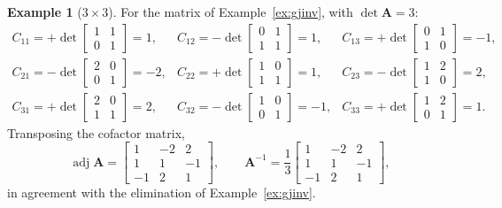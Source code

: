 \documentclass[11pt]{article}
\theoremstyle{plain}
\theoremstyle{definition}
\newtheorem{ex}{Example}[section]
\theoremstyle{remark}
\newcommand{\mt}[1]{\mathbf{#1}}
\DeclareMathOperator{\adj}{adj}
\begin{document}
\begin{ex}[$3\times3$]
For the matrix of Example~\ref{ex:gjinv}, with $\det\mt{A}=3$:
\[
  \begin{array}{lll}
  C_{11}=+\det\begin{bmatrix}1&1\\0&1\end{bmatrix}=1, &
  C_{12}=-\det\begin{bmatrix}0&1\\1&1\end{bmatrix}=1, &
  C_{13}=+\det\begin{bmatrix}0&1\\1&0\end{bmatrix}=-1,\\[12pt]
  C_{21}=-\det\begin{bmatrix}2&0\\0&1\end{bmatrix}=-2, &
  C_{22}=+\det\begin{bmatrix}1&0\\1&1\end{bmatrix}=1, &
  C_{23}=-\det\begin{bmatrix}1&2\\1&0\end{bmatrix}=2,\\[12pt]
  C_{31}=+\det\begin{bmatrix}2&0\\1&1\end{bmatrix}=2, &
  C_{32}=-\det\begin{bmatrix}1&0\\0&1\end{bmatrix}=-1, &
  C_{33}=+\det\begin{bmatrix}1&2\\0&1\end{bmatrix}=1 .
  \end{array}
\]
Transposing the cofactor matrix,
\[
  \adj\mt{A}=\begin{bmatrix}1&-2&2\\1&1&-1\\-1&2&1\end{bmatrix},
  \qquad
  \mt{A}^{-1}=\frac13\begin{bmatrix}1&-2&2\\1&1&-1\\-1&2&1\end{bmatrix},
\]
in agreement with the elimination of Example~\ref{ex:gjinv}.
\end{ex}

\end{document}
